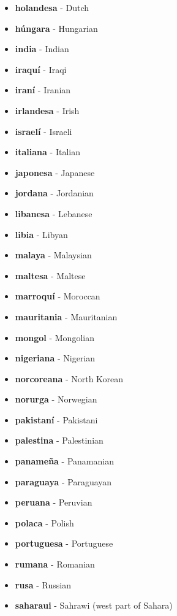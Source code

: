 \documentclass[12pt]{article}
\begin{document}
\begin{itemize}
            \item \textbf{holandesa} - Dutch
            \item \textbf{húngara} - Hungarian
            \item \textbf{india} - Indian
            \item \textbf{iraquí} - Iraqi
            \item \textbf{iraní} - Iranian
            \item \textbf{irlandesa} - Irish
            \item \textbf{israelí} - Israeli
            \item \textbf{italiana} - Italian
            \item \textbf{japonesa} - Japanese
            \item \textbf{jordana} - Jordanian
            \item \textbf{libanesa} - Lebanese
            \item \textbf{libia} - Libyan
            \item \textbf{malaya} - Malaysian
            \item \textbf{maltesa} - Maltese
            \item \textbf{marroquí} - Moroccan
            \item \textbf{mauritania} - Mauritanian
            \item \textbf{mongol} - Mongolian
            \item \textbf{nigeriana} - Nigerian
            \item \textbf{norcoreana} - North Korean
            \item \textbf{norurga} - Norwegian
            \item \textbf{pakistaní} - Pakistani
            \item \textbf{palestina} - Palestinian
            \item \textbf{panameña} - Panamanian
            \item \textbf{paraguaya} - Paraguayan
            \item \textbf{peruana} - Peruvian
            \item \textbf{polaca} - Polish
            \item \textbf{portuguesa} - Portuguese
            \item \textbf{rumana} - Romanian
            \item \textbf{rusa} - Russian
            \item \textbf{saharaui} - Sahrawi (west part of Sahara)

\end{itemize}
\end{document}
